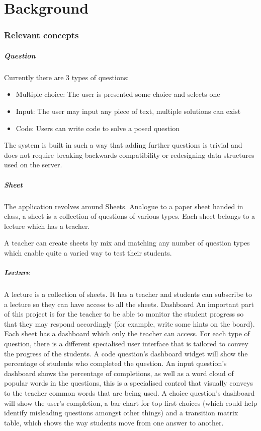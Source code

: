 \chapter{Background}
\subsection{Relevant concepts}
\paragraph{Question}
Currently there are 3 types of questions:
\begin{itemize}
\item Multiple choice: The user is presented some choice and selects one
\item Input: The user may input any piece of text, multiple solutions can exist
\item Code: Users can write code to solve a posed question
\end{itemize}

The system is built in such a way that adding further questions is trivial and does not require breaking backwards compatibility or redesigning data structures used on the server.

\paragraph{Sheet}
The application revolves around Sheets. Analogue to a paper sheet handed in class, a sheet is a collection of questions of various types. Each sheet belongs to a lecture which has a teacher.


A teacher can create sheets by mix and matching any number of question types which enable quite a varied way to test their students.

\paragraph{Lecture}
A lecture is a collection of sheets. It has a teacher and students can subscribe to a lecture so they can have access to all the sheets.
Dashboard
An important part of this project is for the teacher to be able to monitor the student progress so that they may respond accordingly (for example, write some hints on the board). Each sheet has a dashboard which only the teacher can access.
For each type of question, there is a different specialised user interface that is tailored to convey the progress of the students.
A code question's dashboard widget will show the percentage of students who completed the question. 
An input question’s dashboard shows the percentage of completions, as well as a word cloud of popular words in the questions, this is a specialised control that visually conveys to the teacher common words that are being used.
A choice question’s dashboard will show the user’s completion, a bar chart for top first choices (which could help identify misleading questions amongst other things) and a transition matrix table, which shows the way students move from one answer to another.

